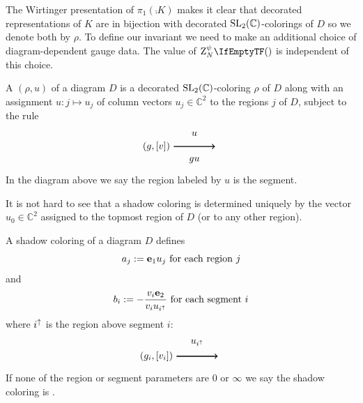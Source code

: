 \documentclass[margincite, leqno]{sl2art}
\numberwithin{equation}{section}
\begin{document}
The Wirtinger presentation of \(\pi_{1}(\comp{K})\) makes it clear
that decorated representations of \(K\) are in bijection with
decorated \(\operatorname{SL}_2(\mathbb{C})\)-colorings of \(D\) so we denote both by \(\rho\).
To define our invariant we need to make an additional choice of
diagram-dependent gauge data.%
The value of \(\qinv{}\) is independent of this choice.

\begin{definition}
  A  \((\rho, u)\) of a diagram \(D\) is a
  decorated \(\operatorname{SL}_2(\mathbb{C})\)-coloring \(\rho\) of \(D\) along with an
  assignment \(u \colon j \mapsto u_{j}\) of column vectors \(u_{j} \in
  \mathbb{C}^{2}\) to the regions \(j\) of \(D\), subject to the rule
  \begin{equation}
    \begin{tikzpicture}[line width=1, baseline=00, scale=1]
      \draw[->] (0,0) node[left] {\((g, [v])\)} to (1.5,0) node[right] {};
      \node[above] at (.75,0.25){\(u\)};
      \node[below] at (.75,-0.25){\(g u\)};
    \end{tikzpicture}
  \end{equation}
  In the diagram above we say the region labeled by \(u\) is
   the segment.
\end{definition}

It is not hard to see that a shadow coloring is determined uniquely
by the vector \(u_{0} \in \mathbb{C}^{2}\) assigned to the topmost
region of \(D\) (or to any other region).

\begin{definition}
  A shadow coloring of a diagram \(D\) defines 
  \begin{equation}
    a_{j} \mathrel{:=} \mathbf{e}_{1} u_{j}
    \text{ for each region \(j\)}
  \end{equation}
  and 
  \begin{equation}
    b_{i} \mathrel{:=}
    -
    \frac{
      v_{i} \mathbf{e}_{2}
    }{
      v_{i} u_{i^{\uparrow}}
    }
    \text{ for each segment \(i\)}
  \end{equation}
  where \(i^{\uparrow}\) is the region above segment \(i\):
  \[
    \begin{tikzpicture}[line width=1, baseline=00, scale=1]
      \draw[->] (0,0) node[left] {\((g_{i}, [v_{i}])\)} to (1.5,0)
      node[right] {};
      \node[above] at (.75,0.25){\(u_{i^{\uparrow}}\)};
    \end{tikzpicture}
  \]
  If none of the region or segment parameters are \(0\) or \(\infty\)
  we say the shadow coloring is .
\end{definition}
\end{document}
